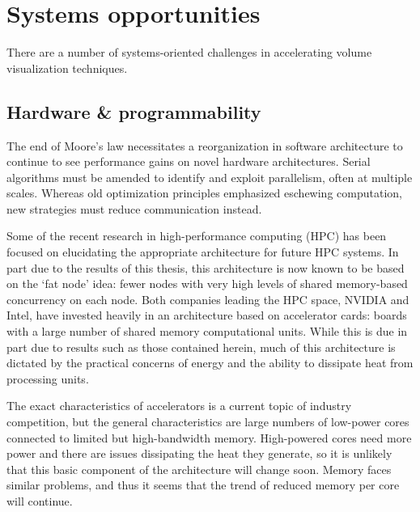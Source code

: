 \section{Systems opportunities}

There are a number of systems-oriented challenges in accelerating
volume visualization techniques.

\subsection{Hardware \& programmability}

The end of Moore's law necessitates a reorganization in software
architecture to continue to see performance gains on novel hardware
architectures.  Serial algorithms must be amended to identify
and exploit parallelism, often at multiple scales.  Whereas old
optimization principles emphasized eschewing computation, new
strategies must reduce communication instead.


Some of the recent research in high-performance computing (HPC) has
been focused on elucidating the appropriate architecture for future HPC
systems.  In part due to the results of this thesis, this architecture
is now known to be based on the `fat node' idea: fewer nodes with
very high levels of shared memory-based concurrency on each node.
Both companies leading the HPC space, NVIDIA and Intel, have invested
heavily in an architecture based on accelerator cards: boards with a
large number of shared memory computational units.  While this is due
in part due to results such as those contained herein, much of this
architecture is dictated by the practical concerns of energy and the
ability to dissipate heat from processing units.


The exact characteristics of accelerators is a current topic of
industry competition, but the general characteristics are large numbers
of low-power cores connected to limited but high-bandwidth memory.
High-powered cores need more power and there are issues dissipating the
heat they generate, so it is unlikely that this basic component of the
architecture will change soon.  Memory faces similar problems, and thus
it seems that the trend of reduced memory per core will continue.

